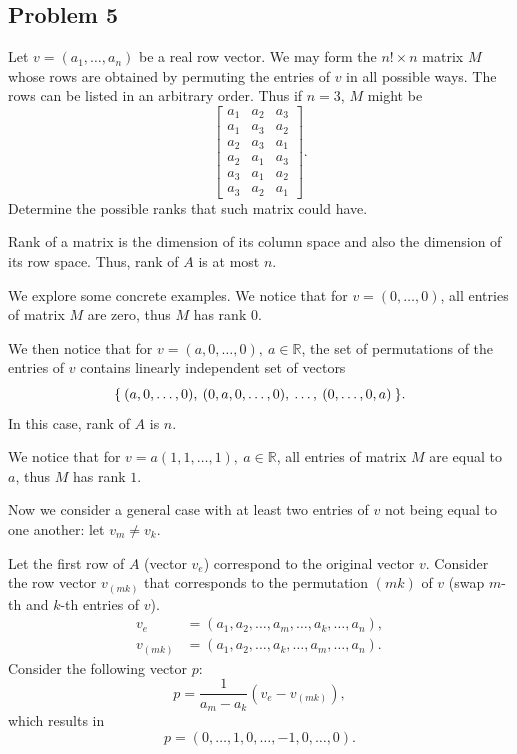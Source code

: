 \documentclass{article}
\theoremstyle{definition}
\newcommand{\R}{\mathbb{R}}
\DeclarePairedDelimiter\set{\{}{\}}
\begin{document}
\subsection*{Problem 5}

\begin{tcolorbox}
Let $v = (a_1, \dots, a_n)$ be a real row vector. We may form the $n! \times n$ matrix $M$ whose rows are obtained by permuting the entries of $v$ in all possible ways. The rows can be listed in an arbitrary order. Thus if $n=3$, $M$ might be
\[
    \begin{bmatrix}
        a_1 & a_2 & a_3 \\
        a_1 & a_3 & a_2 \\
        a_2 & a_3 & a_1 \\
        a_2 & a_1 & a_3 \\
        a_3 & a_1 & a_2 \\
        a_3 & a_2 & a_1
    \end{bmatrix}.
\]
Determine the possible ranks that such matrix could have.
\end{tcolorbox}

Rank of a matrix is the dimension of its column space and also the dimension of its row space.
Thus, rank of $A$ is at most $n$.

We explore some concrete examples.
We notice that for $v=(0,\dots,0)$, all entries of matrix $M$ are zero, thus $M$ has rank $0$.

We then notice that for $v=(a,0,\dots,0), \> a \in \R$, the set of permutations of the entries of $v$ contains linearly independent set of vectors
\[ \set{ \> (a,0,\dots,0), \> (0,a,0,\dots,0), \> \dots, \> (0,\dots,0,a) \> }. \]
In this case, rank of $A$ is $n$.

We notice that for $v=a(1,1,\dots,1), \> a \in \R$, all entries of matrix $M$ are equal to $a$, thus $M$ has rank $1$.

Now we consider a general case with at least two entries of $v$ not being equal to one another: let $v_m \neq v_k$.

Let the first row of $A$ (vector $v_e$) correspond to the original vector $v$.
Consider the row vector $v_{(mk)}$ that corresponds to the permutation $(mk)$ of $v$ (swap $m$-th and $k$-th entries of $v$).
\begin{align*}
    v_e & = (a_1, a_2, \dots, a_m, \dots, a_k, \dots, a_n), \\
    v_{(mk)} & = (a_1, a_2, \dots, a_k, \dots, a_m, \dots, a_n).
\end{align*}
Consider the following vector $p$: 
\begin{equation}\label{eq:4}
    p = \dfrac{1}{a_m-a_k} (v_e - v_{(mk)}),    
\end{equation}
which results in
\[ p = (0, \dots, 1, 0, \dots, -1, 0, \dots, 0). \]
\end{document}
